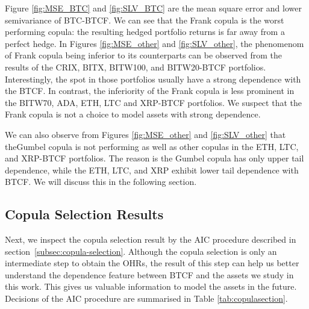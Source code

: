 
Figure \ref{fig:MSE_BTC} and \ref{fig:SLV_BTC} are the mean square
error and lower semivariance of BTC-BTCF. We can see that the Frank copula
is the worst performing copula: 
the resulting hedged portfolio returns is far away from a perfect
hedge. 
In Figures \ref{fig:MSE_other} and \ref{fig:SLV_other}, the phenomenom
of Frank copula being inferior to its counterparts can be observed
from the results of the CRIX, BITX, BITW100, and BITW20-BTCF
portfolios. 
Interestingly, the spot in those portfolios usually have a strong
dependence with the BTCF.
In contrast, the inferiority of the Frank copula is less prominent in
the BITW70, ADA, ETH, LTC and XRP-BTCF portfolios. 
We suspect that the Frank copula is not a choice to model assets with
strong dependence.

We can also observe from Figures \ref{fig:MSE_other} and
\ref{fig:SLV_other} that theGumbel copula is not performing as well as 
other copulas in the ETH, LTC, and XRP-BTCF portfolios. 
The reason is the Gumbel copula has only upper tail dependence,
while the ETH, LTC, and XRP exhibit lower tail dependence with BTCF. 
We will discuss this in the following section.

\subsection{Copula Selection Results}\label{subsec:-copula-results}
\begin{table}[t]

    \label{tab:copulasection}
\end{table}
Next, we inspect the copula selection result by the AIC procedure described in section~\ref{subsec:copula-selection}.
Although the copula selection is only an intermediate step to obtain the OHRs,
the result of this step can help us better understand the dependence
feature between BTCF and the assets we study in this work.
This gives us valuable information to model the assets in the future.
Decisions of the AIC procedure are summarised in Table \ref{tab:copulasection}.

